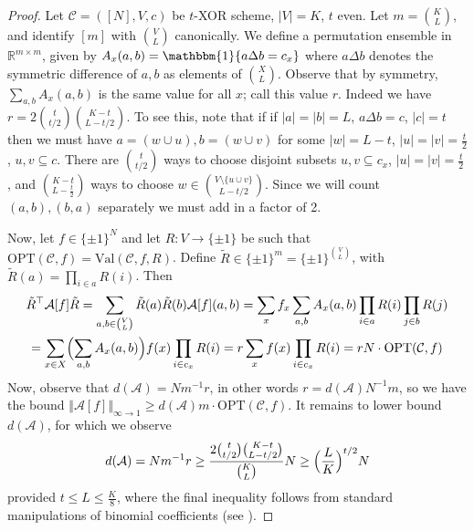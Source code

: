\documentclass[11pt]{article}
\newcommand{\norm}[1]{\Vert #1 \Vert}
\newcommand{\Opt}{\mathrm{OPT}}
\begin{document}
\begin{proof}
Let $\mathcal{C} = ([N],V,c)$ be $t$-XOR scheme, $|V|=K$, $t$ even.
Let $m = \binom{K}{L}$, and identify $[m]$ with $\binom{V}{L}$ canonically. We define a permutation ensemble in $\mathbb{R}^{m \times m}$, given by $A_x(a,b) = \mathbbm{1}\{a\Delta b = c_x\}$
where $a\Delta b$ denotes the symmetric difference of $a,b$ as elements of $\binom{X}{L}$. Observe that by symmetry, $\sum_{a,b}A_x(a,b)$ is the same value for all $x$; call this value $r$. Indeed we have $r = 2\binom{t}{t/2}\binom{K - t}{L - t/2}$. To see this, note that if if $|a|=|b|=L$, $a \Delta b = c$, $|c|=t$ then we must have $a = (w \cup u), b = (w \cup v)$ for some $|w|=L-t$, $|u|=|v|=\frac{t}{2}$, $u,v \subseteq c$. There are $\binom{t}{t/2}$ ways to choose disjoint subsets $u,v \subseteq c_x$, $|u|=|v|= \frac{t}{2}$, and $\binom{K-t}{L-\frac{t}{2}}$ ways to choose $w \in \binom{V\setminus \{u \cup v\}}{L-t/2}$. Since we will count $(a,b), (b,a)$ separately we must add in a factor of 2. 

Now, let $f \in \{\pm 1\}^N$ and let $R: V \to \{\pm 1\}$ be such that $\Opt(\mathcal{C},f) = \mathrm{Val}(\mathcal{C},f,R)$.
Define $\tilde{R} \in \{\pm 1\}^m = \{\pm 1\}^{\binom{V}{L}}$, with $\tilde{R}(a) = \prod_{i \in a} R(i)$. Then
\begin{gather*}
	\tilde{R}^\top \mathcal{A}[f] \tilde{R} = \sum_{a,b \in \binom{V}{L}} \tilde{R}(a)\tilde{R}(b) \mathcal{A}[f](a,b)
	= \sum_{x} f_x\sum_{a,b}A_x(a,b)\prod_{i \in a} R(i) \prod_{j \in b} R(j)\\
	= \sum_{x \in X}\Bigl(\sum_{a,b}A_x(a,b)\Bigr)f(x)\prod_{i \in c_x} R(i)
	= r\sum_{x} f(x)\prod_{i \in c_x} R(i)
	= rN \cdot \Opt(\mathcal{C},f) 
\end{gather*}
Now, observe that $d(\mathcal{A}) =  Nm^{-1}r$, in other words $r = d(\mathcal{A}) N^{-1}m$, so we have the bound $ \norm{\mathcal{A}[f]}_{\infty \to 1} \geq d(\mathcal{A})m \cdot \Opt(\mathcal{C},f)$. It remains to lower bound $d(\mathcal{A})$, for which we observe
\begin{gather*}
d(\mathcal{A}) = Nm^{-1}r \geq \frac{2\binom{t}{t/2}\binom{K - t}{L - t/2}}{ \binom{K}{L}}N \geq  \Bigl(\frac{L}{K}\Bigr)^{t/2} N
\end{gather*}
provided $t \leq L \leq \frac{K}{8}$, where the final inequality follows from standard manipulations of binomial coefficients (see \cite{simpler-moore}). 
\end{proof}
\end{document}
